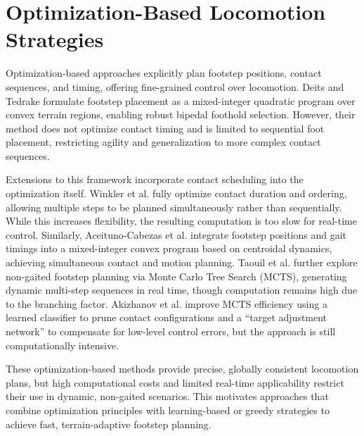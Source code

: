 \section{Optimization-Based Locomotion Strategies}

Optimization-based approaches explicitly plan footstep positions,
contact sequences, and timing, offering fine-grained control over
locomotion. Deits and Tedrake \cite{deits_footstep_2014} formulate
footstep placement as a mixed-integer quadratic program over convex
terrain regions, enabling robust bipedal foothold selection. However,
their method does not optimize contact timing and is limited to
sequential foot placement, restricting agility and generalization to
more complex contact sequences.

Extensions to this framework incorporate contact scheduling into the
optimization itself. Winkler et al. \cite{winkler_gait_2018} fully
optimize contact duration and ordering, allowing multiple steps to be
planned simultaneously rather than sequentially. While this increases
flexibility, the resulting computation is too slow for real-time
control. Similarly, Aceituno-Cabezas et al.
\cite{aceituno_simultaneous_2019} integrate footstep positions and
gait timings into a mixed-integer convex program based on centroidal
dynamics, achieving simultaneous contact and motion planning. Taouil
et al. \cite{taouil_non-gaited_2025} further explore non-gaited
footstep planning via Monte Carlo Tree Search (MCTS), generating
dynamic multi-step sequences in real time, though computation remains
high due to the branching factor. Akizhanov et al.
\cite{akizhanov_learning_2024} improve MCTS efficiency using a
learned classifier to prune contact configurations and a “target
adjustment network” to compensate for low-level control errors, but
the approach is still computationally intensive.

These optimization-based methods provide precise, globally consistent
locomotion plans, but high computational costs and limited real-time
applicability restrict their use in dynamic, non-gaited scenarios.
This motivates approaches that combine optimization principles with
learning-based or greedy strategies to achieve fast, terrain-adaptive
footstep planning.
